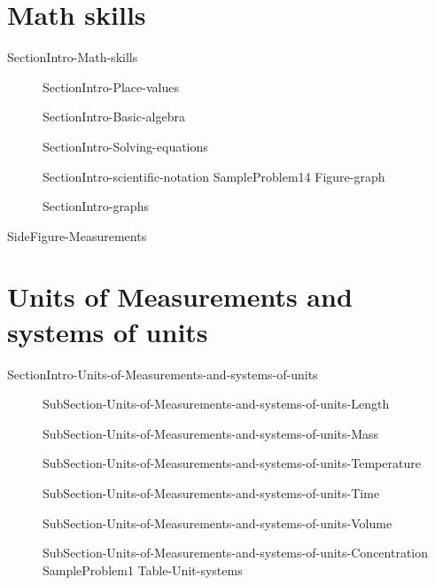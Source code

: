 \documentclass[main.tex]{subfiles}
\newcommand\chapterlabel{Ch-measurements}\setcounter{figurenewcounter}{0}\setcounter{tablenewcounter}{0}\setcounter{formulanewcounter}{0}\chapterpicture{../{\chapterlabel}/figure1}\chapterpicturelabel{PngImg}
\begin{document}
\section{Math skills}
{SectionIntro-Math-skills}
 \sloppy\begin{description}
 \item[]{SectionIntro-Place-values}
  \item[]{SectionIntro-Basic-algebra}
  \item[]{SectionIntro-Solving-equations}
 \item[]{SectionIntro-scientific-notation}
 {SampleProblem14}%
 {Figure-graph}
  \item[]{SectionIntro-graphs}
\end{description}



{SideFigure-Measurements}
\section{Units of Measurements and systems of units}
{SectionIntro-Units-of-Measurements-and-systems-of-units}
\sloppy\begin{description}
\item[]{SubSection-Units-of-Measurements-and-systems-of-units-Length}
\item[]{SubSection-Units-of-Measurements-and-systems-of-units-Mass}
\item[]{SubSection-Units-of-Measurements-and-systems-of-units-Temperature}
\item[]{SubSection-Units-of-Measurements-and-systems-of-units-Time}
\item[]{SubSection-Units-of-Measurements-and-systems-of-units-Volume}
\item[]{SubSection-Units-of-Measurements-and-systems-of-units-Concentration}
{SampleProblem1}%
{Table-Unit-systems}
\end{description}
\end{document}
